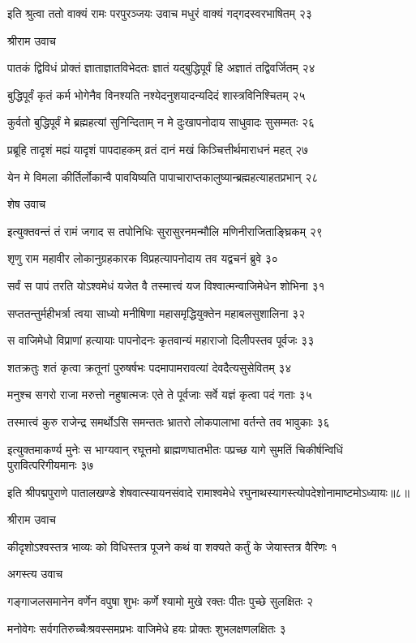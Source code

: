 इति श्रुत्वा ततो वाक्यं रामः परपुरञ्जयः
उवाच मधुरं वाक्यं गद्गदस्वरभाषितम् २३

श्रीराम उवाच

पातकं द्विविधं प्रोक्तं ज्ञाताज्ञातविभेदतः
ज्ञातं यद्बुद्धिपूर्वं हि अज्ञातं तद्विवर्जितम् २४

बुद्धिपूर्वं कृतं कर्म भोगेनैव विनश्यति
नश्येदनुशयादन्यदिदं शास्त्रविनिश्चितम् २५

कुर्वतो बुद्धिपूर्वं मे ब्रह्महत्यां सुनिन्दिताम्
न मे दुःखापनोदाय साधुवादः सुसम्मतः २६

प्रब्रूहि तादृशं मह्यं यादृशं पापदाहकम्
व्रतं दानं मखं किञ्चित्तीर्थमाराधनं महत् २७

येन मे विमला कीर्तिर्लोकान्वै पावयिष्यति
पापाचाराप्तकालुष्यान्ब्रह्महत्याहतप्रभान् २८

शेष उवाच

इत्युक्तवन्तं तं रामं जगाद स तपोनिधिः
सुरासुरनमन्मौलि मणिनीराजिताङ्घ्रिकम् २९

शृणु राम महावीर लोकानुग्रहकारक
विप्रहत्यापनोदाय तव यद्वचनं ब्रुवे ३०

सर्वं स पापं तरति योऽश्वमेधं यजेत वै
तस्मात्त्वं यज विश्वात्मन्वाजिमेधेन शोभिना ३१

सप्ततन्तुर्महीभर्त्रा त्वया साध्यो मनीषिणा
महासमृद्धियुक्तेन महाबलसुशालिना ३२

स वाजिमेधो विप्राणां हत्यायाः पापनोदनः
कृतवान्यं महाराजो दिलीपस्तव पूर्वजः ३३

शतक्रतुः शतं कृत्वा क्रतूनां पुरुषर्षभः
पदमापामरावत्यां देवदैत्यसुसेवितम् ३४

मनुश्च सगरो राजा मरुत्तो नहुषात्मजः
एते ते पूर्वजाः सर्वे यज्ञं कृत्वा पदं गताः ३५

तस्मात्त्वं कुरु राजेन्द्र समर्थोऽसि समन्ततः
भ्रातरो लोकपालाभा वर्तन्ते तव भावुकाः ३६

इत्युक्तमाकर्ण्य मुनेः स भाग्यवान् रघूत्तमो ब्राह्मणघातभीतः
पप्रच्छ यागे सुमतिं चिकीर्षन्विधिं पुरावित्परिगीयमानः ३७

इति श्रीपद्मपुराणे पातालखण्डे शेषवात्स्यायनसंवादे रामाश्वमेधे रघुनाथस्यागस्त्योपदेशोनामाष्टमोऽध्यायः॥८॥


श्रीराम उवाच

कीदृशोऽश्वस्तत्र भाव्यः को विधिस्तत्र पूजने
कथं वा शक्यते कर्तुं के जेयास्तत्र वैरिणः १

अगस्त्य उवाच

गङ्गाजलसमानेन वर्णेन वपुषा शुभः
कर्णे श्यामो मुखे रक्तः पीतः पुच्छे सुलक्षितः २

मनोवेगः सर्वगतिरुच्चैःश्रवस्समप्रभः
वाजिमेधे हयः प्रोक्तः शुभलक्षणलक्षितः ३

